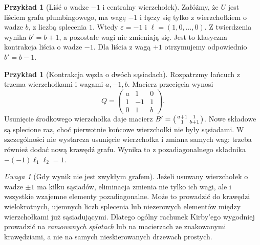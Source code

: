 \documentclass[11pt,a4paper]{report}
\numberwithin{equation}{section}
\theoremstyle{plain}
\theoremstyle{definition}
\newtheorem{przyklad}[twierdzenie]{Przykład}
\theoremstyle{remark}
\newtheorem{uwaga}[twierdzenie]{Uwaga}
\begin{document}
\begin{przyklad}[Liść o wadze $-1$ i centralny wierzchołek]
Załóżmy, że $U$ jest liściem grafu plumbingowego,
ma wagę $-1$ i łączy się tylko z wierzchołkiem
o wadze $b$, z liczbą splecenia $1$.
Wtedy $\varepsilon=-1$ i $\ell=(1,0,\ldots,0)$.
Z twierdzenia wynika $b'=b+1$, a pozostałe wagi
nie zmieniają się. Jest to klasyczna kontrakcja
liścia o wadze $-1$. Dla liścia z wagą $+1$
otrzymujemy odpowiednio $b'=b-1$.
\end{przyklad}

\begin{przyklad}[Kontrakcja węzła o dwóch sąsiadach]
Rozpatrzmy łańcuch z trzema wierzchołkami i wagami
$a,-1,b$. Macierz przecięcia wynosi
\[
Q=\begin{pmatrix}a&1&0\\1&-1&1\\0&1&b\end{pmatrix}.
\]
Usunięcie środkowego wierzchołka daje macierz
$B'=\begin{psmallmatrix}a+1&1\\1&b+1\end{psmallmatrix}$.
Nowe składowe są splecione raz, choć pierwotnie
końcowe wierzchołki nie były sąsiadami.
W szczególności nie wystarcza usunięcie wierzchołka
i zmiana samych wag: trzeba również dodać nową
krawędź grafu. Wynika to z pozadiagonalnego składnika
$-(-1)\ell_1\ell_2=1$.
\end{przyklad}

\begin{center}
\end{center}

\begin{uwaga}[Gdy wynik nie jest zwykłym grafem]
Jeżeli usuwany wierzchołek o wadze $\pm1$ ma
kilku sąsiadów, eliminacja zmienia nie tylko ich
wagi, ale i wszystkie wzajemne elementy pozadiagonalne.
Może to prowadzić do krawędzi wielokrotnych,
ujemnych liczb splecenia lub niezerowych elementów
między wierzchołkami już sąsiadującymi. Dlatego
ogólny rachunek Kirby'ego wygodniej prowadzić
na \emph{ramowanych splotach} lub na macierzach
ze znakowanymi krawędziami, a nie na samych
nieskierowanych drzewach prostych.
\end{uwaga}
\end{document}
